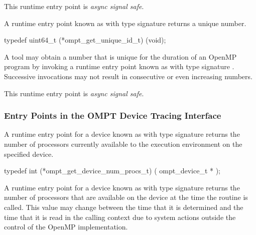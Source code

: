This runtime entry point is \emph{async signal safe}.



\label{sec:ompt_get_unique_id_t}
\label{sec:ompt_get_unique_id}

\summary
A runtime entry point known as 
with type signature 
returns a unique number.

\format
\begin{ccppspecific}
\begin{omptInquiry}
typedef uint64_t (*ompt_get_unique_id_t) (void);
\end{omptInquiry}
\end{ccppspecific}

\descr

A tool may obtain a number that is unique for the duration of an
OpenMP program by invoking a runtime entry point
known as 
with type signature .
Successive invocations may not result in
consecutive or even increasing numbers.

This runtime entry point is \emph{async signal safe}.




\subsubsection{Entry Points in the OMPT Device Tracing Interface}
\label{sec:ompt-tracing-entry-points}


\label{sec:ompt_get_device_num_procs_t}

\summary

A runtime entry point for a device known as
 with type signature
 returns
the number of processors currently available to the execution
environment on the specified device.

\format
\begin{ccppspecific}
\begin{omptInquiry}
typedef int (*ompt_get_device_num_procs_t) (
  ompt_device_t *
);
\end{omptInquiry}
\end{ccppspecific}

\descr
A runtime entry point for a device known
as  with type signature
 returns the
number of processors that are available on the device at the time
the routine is called. This value may change between the time that
it is determined and the time that it is read in the calling context due to
system actions outside the control of the OpenMP implementation.

